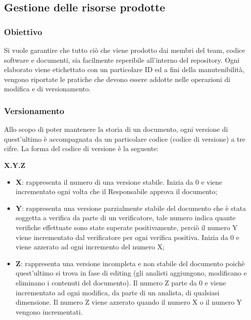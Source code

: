 \subsection{Gestione delle risorse prodotte}
\subsubsection{Obiettivo}

Si vuole garantire che tutto ciò che viene prodotto dai membri del team, codice software e documenti, sia facilmente reperibile all’interno del repository. Ogni elaborato viene etichettato con un particolare ID ed a fini della manutenibilità, vengono riportate le pratiche che devono essere addotte nelle operazioni di modifica e di versionamento.

\subsubsection{Versionamento}
Allo scopo di poter mantenere la storia di un documento, ogni versione di quest'ultimo è accompagnata da un particolare codice (codice di versione) a tre cifre. La forma del codice di versione è la seguente:
\begin{center}
	\textbf{X.Y.Z}
\end{center}
\begin{itemize}
\item \textbf{X}: rappresenta il numero di una versione stabile. Inizia da 0 e viene incrementato ogni volta che il Responsabile approva il documento;
\item \textbf{Y}: rappresenta una versione parzialmente stabile del documento che è stata soggetta a verifica da parte di un verificatore, tale numero indica quante verifiche effettuate sono state superate positivamente, perciò il numero Y viene incrementato dal verificatore per ogni verifica positiva. Inizia da 0 e viene azzerato ad ogni incremento del numero X;
\item \textbf{Z}: rappresenta una versione incompleta e non stabile del documento poichè quest'ultimo si trova in fase di editing (gli analisti aggiungono, modificano e eliminano i contenuti del documento). Il numero Z parte da 0 e viene incrementato ad ogni modifica, da parte di un analista, di qualsiasi dimensione. Il numero Z viene azzerato quando il numero X o il numero Y vengono incrementati.
\end{itemize}

